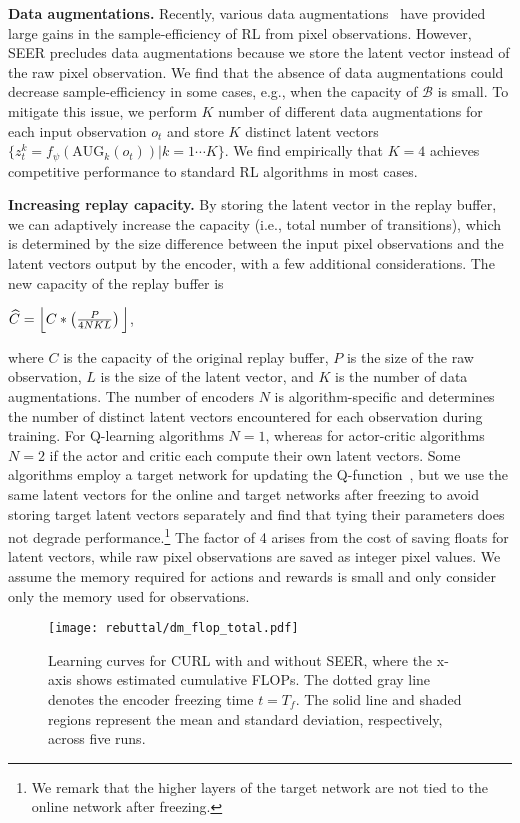 \documentclass{article}
\begin{document}
\textbf{Data augmentations.} Recently, various data augmentations~\citep{srinivas2020curl, laskin2020reinforcement,kostrikov2020image} have provided large gains in the sample-efficiency of RL from pixel observations.
However, SEER precludes data augmentations because we store the latent vector instead of the raw pixel observation.
We find that the absence of data augmentations could decrease sample-efficiency in some cases, e.g., when the capacity of $\mathcal{B}$ is small.
To mitigate this issue,
we perform $K$ number of different data augmentations for each input observation $o_t$ and store $K$ distinct latent vectors $\{ z^k_{t} = f_\psi(\text{AUG}_k (o_t)) | k=1\cdots K\}$.
We find empirically that $K=4$ achieves competitive performance to standard RL algorithms in most cases.

\textbf{Increasing replay capacity.} 
By storing the latent vector in the replay buffer,
we can adaptively increase the capacity (i.e., total number of transitions), which is determined by the size difference between the input pixel observations and the latent vectors output by the encoder, with a few additional considerations.
The new capacity of the replay buffer is
\begin{center}
    $\widehat{C}=  \Bigl\lfloor C*\left(\frac{P}{4NKL}\right)\Bigl\rfloor $,
\end{center}
where $C$ is the capacity of the original replay buffer, $P$ is the size of the raw observation, $L$ is the size of the latent vector, and $K$ is the number of data augmentations. 
The number of encoders $N$ is algorithm-specific and determines the number of distinct latent vectors encountered for each observation during training.
For Q-learning algorithms $N=1$, whereas for actor-critic algorithms $N=2$ if the actor and critic each compute their own latent vectors. Some algorithms employ a target network for updating the  Q-function~\citep{mnih2015human,haarnoja2018soft}, 
but we use the same latent vectors for the online and target networks after freezing to avoid storing target latent vectors separately and find that tying their parameters does not degrade performance.\footnote{We remark that the higher layers of the target network are not tied to the online network after freezing.}
The factor of 4 arises from the cost of saving floats for latent vectors, while raw pixel observations are saved as integer pixel values. We assume the memory required for actions and rewards is small and only consider only the memory used for observations. 

\begin{figure*} [t] \centering
\texttt{[image: rebuttal/dm\_flop\_total.pdf]}
\caption{Learning curves for CURL with and without SEER, where the x-axis shows estimated cumulative FLOPs. The dotted gray line denotes the encoder freezing time $t=T_f$. 
The solid line and shaded regions represent the mean and standard deviation, respectively, across five runs.}
\label{fig:main_dmc}
\vspace{-0.1in}
\end{figure*}
\end{document}
